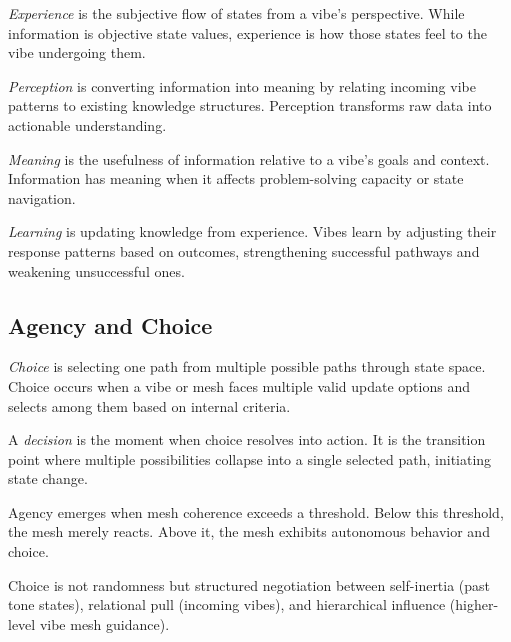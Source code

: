 \begin{definition}[Experience]
\emph{Experience} is the subjective flow of states from a vibe's perspective. While information is objective state values, experience is how those states feel to the vibe undergoing them.
\end{definition}

\begin{definition}[Perception]
\emph{Perception} is converting information into meaning by relating incoming vibe patterns to existing knowledge structures. Perception transforms raw data into actionable understanding.
\end{definition}

\begin{definition}[Meaning]
\emph{Meaning} is the usefulness of information relative to a vibe's goals and context. Information has meaning when it affects problem-solving capacity or state navigation.
\end{definition}

\begin{definition}[Learning]
\emph{Learning} is updating knowledge from experience. Vibes learn by adjusting their response patterns based on outcomes, strengthening successful pathways and weakening unsuccessful ones.
\end{definition}

\subsection{Agency and Choice}

\begin{definition}[Choice]
\emph{Choice} is selecting one path from multiple possible paths through state space. Choice occurs when a vibe or mesh faces multiple valid update options and selects among them based on internal criteria.
\end{definition}

\begin{definition}[Decision]
A \emph{decision} is the moment when choice resolves into action. It is the transition point where multiple possibilities collapse into a single selected path, initiating state change.
\end{definition}

Agency emerges when mesh coherence exceeds a threshold. Below this threshold, the mesh merely reacts. Above it, the mesh exhibits autonomous behavior and choice.

Choice is not randomness but structured negotiation between self-inertia (past tone states), relational pull (incoming vibes), and hierarchical influence (higher-level vibe mesh guidance).

